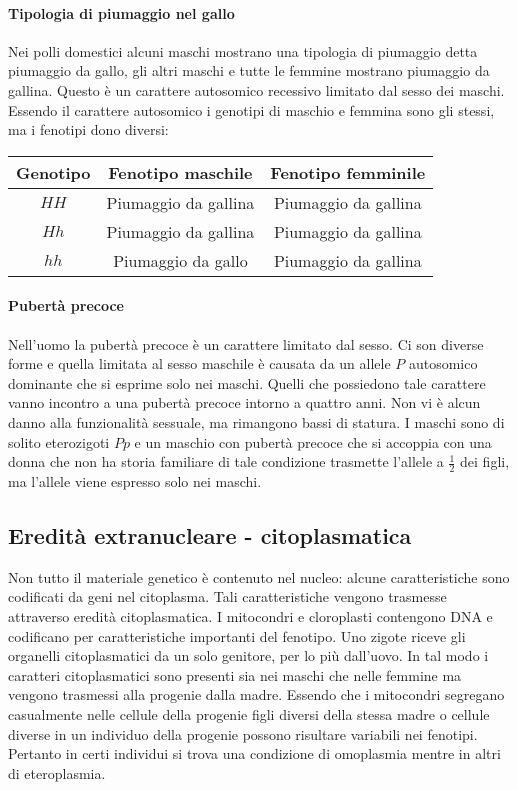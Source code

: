 \paragraph{Tipologia di piumaggio nel gallo}
Nei polli domestici alcuni maschi mostrano una tipologia di piumaggio detta piumaggio da gallo, gli altri maschi e tutte le femmine mostrano piumaggio da gallina. Questo \`e un carattere autosomico
recessivo limitato dal sesso dei maschi. Essendo il carattere autosomico i genotipi di maschio e femmina sono gli stessi, ma i fenotipi dono diversi:
\begin{center}
	\begin{tabular}{|c|c|c|}
		\hline
		Genotipo & Fenotipo maschile & Fenotipo femminile \\
		\hline
		$HH$ & Piumaggio da gallina & Piumaggio da gallina \\
		\hline
		$Hh$ & Piumaggio da gallina & Piumaggio da gallina \\
		\hline
		$hh$ & Piumaggio da gallo & Piumaggio da gallina \\
		\hline
	\end{tabular}
\end{center}
\paragraph{Pubert\`a precoce}
Nell'uomo la pubert\`a precoce \`e un carattere limitato dal sesso. Ci son diverse forme e quella limitata al sesso maschile \`e causata da un allele $P$ autosomico dominante che si esprime solo nei 
maschi. Quelli che possiedono tale carattere vanno incontro a una pubert\`a precoce intorno a quattro anni. Non vi \`e alcun danno alla funzionalit\`a sessuale, ma rimangono bassi di statura. I maschi
sono di solito eterozigoti $Pp$ e un maschio con pubert\`a precoce che si accoppia con una donna che non ha storia familiare di tale condizione trasmette l'allele a $\frac{1}{2}$ dei figli, ma l'allele
viene espresso solo nei maschi. 
\subsection{Eredit\`a extranucleare - citoplasmatica}
Non tutto il materiale genetico \`e contenuto nel nucleo: alcune caratteristiche sono codificati da geni nel citoplasma. Tali caratteristiche vengono trasmesse attraverso eredit\`a citoplasmatica. I
mitocondri e cloroplasti contengono DNA e codificano per caratteristiche importanti del fenotipo. Uno zigote riceve gli organelli citoplasmatici da un solo genitore, per lo pi\`u dall'uovo. In tal
modo i caratteri citoplasmatici sono presenti sia nei maschi che nelle femmine ma vengono trasmessi alla progenie dalla madre. Essendo che i mitocondri segregano casualmente nelle cellule della
progenie figli diversi della stessa madre o cellule diverse in un individuo della progenie possono risultare variabili nei fenotipi. Pertanto in certi individui si trova una condizione di 
omoplasmia mentre in altri di eteroplasmia. 
